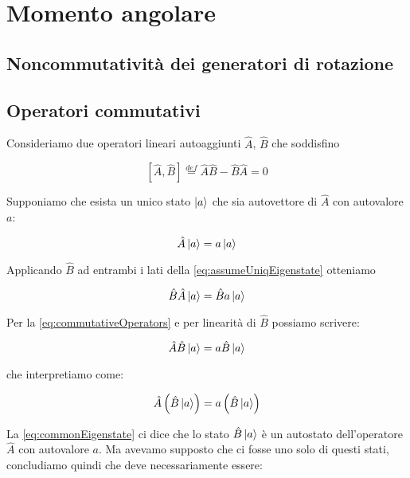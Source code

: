 \section{Momento angolare}

\subsection{Noncommutativit\`a dei generatori di rotazione}



\subsection{Operatori commutativi}

Consideriamo due operatori lineari autoaggiunti $\hat{A}$, $\hat{B}$ che soddisfino

	\begin{equation} \label{eq:commutativeOperators}
		\left [ \hat{A}, \hat{B} \right ] \overset{def}{=} \hat{A}\hat{B} - \hat{B}\hat{A} = 0
	\end{equation}

Supponiamo che esista un unico stato $\ket{a}$ che sia autovettore di $\hat{A}$ con autovalore $a$:

	\begin{equation} \label{eq:assumeUniqEigenstate}
		\hat{A}\ket{a} = a \ket{a}
	\end{equation}

Applicando $\hat{B}$ ad entrambi i lati della \eqref{eq:assumeUniqEigenstate} otteniamo

	\begin{equation}
		\hat{B}\hat{A}\ket{a} = \hat{B}a\ket{a}
	\end{equation}

Per la \eqref{eq:commutativeOperators} e per linearit\`a di $\hat{B}$ possiamo scrivere:

	\begin{equation}
		\hat{A}\hat{B} \ket{a} = a \hat{B} \ket{a}
	\end{equation}

che interpretiamo come:

	\begin{equation} \label{eq:commonEigenstate}
		\hat{A} \left ( \hat{B} \ket{a} \right ) = a \left ( \hat{B} \ket{a} \right )
	\end{equation}

La \eqref{eq:commonEigenstate} ci dice che lo stato $\hat{B} \ket{a}$ \`e un autostato dell'operatore $\hat{A}$ con autovalore $a$. Ma avevamo supposto che ci fosse uno solo di questi stati, concludiamo quindi che deve necessariamente essere:

